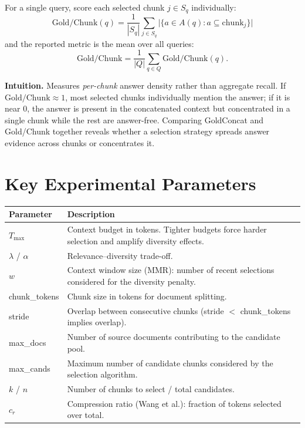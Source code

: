 \documentclass[11pt,a4paper]{article}
\begin{document}
For a single query, score each selected chunk $j \in S_q$ individually:
\[
	\mathrm{Gold/Chunk}(q) = \frac{1}{|S_q|} \sum_{j \in S_q} \big|\{ a \in A(q) : a \subseteq \text{chunk}_j \}\big|
\]
and the reported metric is the mean over all queries:
\[
	\mathrm{Gold/Chunk} = \frac{1}{|Q|} \sum_{q \in Q} \mathrm{Gold/Chunk}(q).
\]

\textbf{Intuition.} Measures \emph{per-chunk} answer density rather than aggregate recall. If $\mathrm{Gold/Chunk} \approx 1$, most selected chunks individually mention the answer; if it is near $0$, the answer is present in the concatenated context but concentrated in a single chunk while the rest are answer-free. Comparing GoldConcat and Gold/Chunk together reveals whether a selection strategy spreads answer evidence across chunks or concentrates it.

\section{Key Experimental Parameters}

\begin{tabular}{ll}
	\toprule
	Parameter & Description\\
	\midrule
	$T_{\max}$ & Context budget in tokens. Tighter budgets force harder selection and amplify diversity effects.\\
	$\lambda$ / $\alpha$ & Relevance--diversity trade-off.\\
	$w$ & Context window size (MMR): number of recent selections considered for the diversity penalty.\\
	chunk\_tokens & Chunk size in tokens for document splitting.\\
	stride & Overlap between consecutive chunks (stride $<$ chunk\_tokens implies overlap).\\
	max\_docs & Number of source documents contributing to the candidate pool.\\
	max\_cands & Maximum number of candidate chunks considered by the selection algorithm.\\
	$k$ / $n$ & Number of chunks to select / total candidates.\\
	$c_r$ & Compression ratio (Wang et al.): fraction of tokens selected over total.\\
	\bottomrule
\end{tabular}
\end{document}
